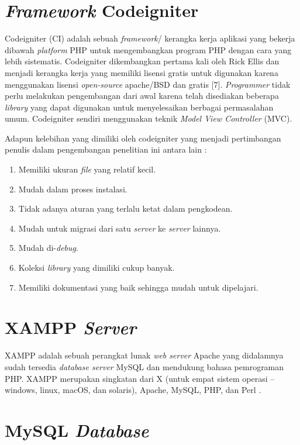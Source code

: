 \section{\emph{Framework} Codeigniter} 

Codeigniter (CI) adalah sebuah \emph{framework}/ kerangka kerja aplikasi yang bekerja dibawah \emph{platform} PHP untuk mengembangkan program PHP dengan cara yang lebih sistematis. Codeigniter dikembangkan pertama kali oleh Rick Ellis dan menjadi kerangka kerja yang memiliki lisensi gratis untuk digunakan karena menggunakan lisensi \emph{open-source} apache/BSD dan gratis [7]. \textit{Programmer} tidak perlu melakukan pengembangan dari awal karena telah disediakan beberapa \emph{library} yang dapat digunakan untuk menyelesaikan berbagai permasalahan umum. Codeigniter sendiri menggunakan teknik \emph{Model View Controller} (MVC).

Adapun kelebihan yang dimiliki oleh codeigniter yang menjadi pertimbangan penulis dalam pengembangan penelitian ini antara lain \cite{yicheng} :

\begin{enumerate}
	\item Memiliki ukuran \emph{file} yang relatif kecil.
	\item Mudah dalam proses instalasi. 
	\item Tidak adanya aturan yang terlalu ketat dalam pengkodean.
	\item Mudah untuk migrasi dari satu \emph{server} ke \emph{server} lainnya.
	\item Mudah di-\emph{debug}.
	\item Koleksi \emph{library} yang dimiliki cukup banyak.
	\item Memiliki dokumentasi yang baik sehingga mudah untuk dipelajari.
\end{enumerate}

\section{XAMPP \emph{Server}}

XAMPP adalah sebuah perangkat lunak \emph{web server} Apache yang didalamnya sudah tersedia \emph{database server} MySQL dan mendukung bahasa pemrograman PHP. XAMPP merupakan singkatan dari X (untuk empat sistem operasi – windows, linux, macOS, dan solaris), Apache, MySQL, PHP, dan Perl \cite{binarso}.

\section{MySQL \emph{Database}}

